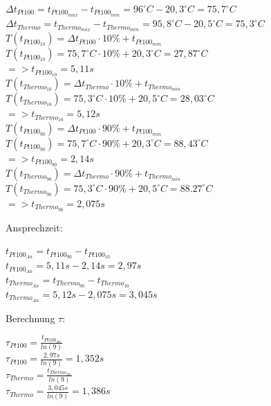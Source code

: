 \documentclass[a4paper,11pt,oneside]{article}
\begin{document}
\begin{center}
$\Delta t_{Pt100} = t_{Pt100_{max}} - t_{Pt100_{min}} = 96^\circ C - 20,3^\circ C = 75,7^\circ C$\\
$\Delta t_{Thermo} = t_{Thermo_{max}} - t_{Thermo_{min}} = 95,8^\circ C - 20,5^\circ C = 75,3^\circ C$\\
\vspace{0.5cm}
$T(t_{Pt100_{10}}) = \Delta t_{Pt100} \cdot 10\% + t_{Pt100_{min}}$\\
$T(t_{Pt100_{10}}) = 75,7^\circ C \cdot 10\% + 20,3^\circ C = 27,87^\circ C$\\
$=> t_{Pt100_{10}} = 5,11s$\\
\vspace{0.5cm}
$T(t_{Thermo_{10}}) = \Delta t_{Thermo} \cdot 10\% + t_{Thermo_{min}}$\\
$T(t_{Thermo_{10}}) = 75,3^\circ C \cdot 10\% + 20,5^\circ C = 28,03^\circ C$\\
$=> t_{Thermo_{10}} = 5,12s$\\
\vspace{0.5cm}
$T(t_{Pt100_{90}}) = \Delta t_{Pt100} \cdot 90\% + t_{Pt100_{min}}$\\
$T(t_{Pt100_{90}}) = 75,7^\circ C \cdot 90\% + 20,3^\circ C = 88,43^\circ C$\\
$=> t_{Pt100_{90}} = 2,14s$\\
\vspace{0.5cm}
$T(t_{Thermo_{90}}) = \Delta t_{Thermo} \cdot 90\% + t_{Thermo_{min}}$\\
$T(t_{Thermo_{90}}) = 75,3^\circ C \cdot 90\% + 20,5^\circ C = 88.27^\circ C$\\
$=> t_{Thermo_{90}} = 2,075s$\\
\end{center}
Ansprechzeit:\\
\begin{center}
$t_{Pt100_{An}} = t_{Pt100_{90}} - t_{Pt100_{10}}$\\
$t_{Pt100_{An}} = 5,11s-2,14s=2,97s$\\
\vspace{0.5cm}
$t_{Thermo_{An}} = t_{Thermo_{90}} - t_{Thermo_{10}}$\\
$t_{Thermo_{An}} = 5,12s-2,075s = 3,045s$\\

\end{center}

Berechnung $\tau$:\\
\begin{center}
$\tau_{Pt100} = \frac{t_{Pt100_{An}}}{ln(9)}$\\
$\tau_{Pt100} = \frac{2,97s}{ln(9)} = 1,352s$\\
\vspace{0.5cm}
$\tau_{Thermo} = \frac{t_{Thermo_{An}}}{ln(9)}$\\
$\tau_{Thermo} = \frac{3,045s}{ln(9)} = 1,386s$\\
\end{center}
\end{document}
